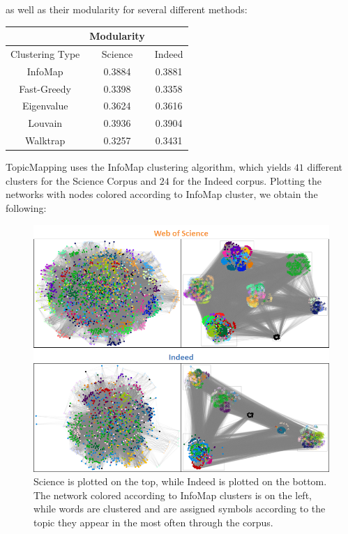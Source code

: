 \documentclass[12pt]{article}
\begin{document}
\noindent as well as their modularity for several different methods:
\vspace{2mm}
\begin{center}
	\begin{tabular}{ |c|c|c|  }
		\hline
		&Modularity& \\
		\hline
		Clustering Type&Science&Indeed \\ 
		\hline 
		InfoMap& 0.3884&0.3881 \\
		Fast-Greedy& 0.3398& 0.3358\\
		Eigenvalue& 0.3624&0.3616 \\
		Louvain&0.3936&0.3904 \\
		Walktrap&0.3257&0.3431 \\
		\hline
	\end{tabular}
\end{center}
\vspace{2mm}
\noindent TopicMapping uses the InfoMap clustering algorithm, which yields $41$ different clusters for the Science Corpus and $24$ for the Indeed corpus. Plotting the networks with nodes colored according to InfoMap cluster, we obtain the following:
\vspace{2mm}
\begin{figure}[H]
	\centering
	\includegraphics[scale=0.5]{Images/networks.png}
	\caption{Science is plotted on the top, while Indeed is plotted on the bottom. The network colored according to InfoMap clusters is on the left, while words are clustered and are assigned symbols according to the topic they appear in the most often through the corpus.}
\end{figure}
\vspace{2mm}
\end{document}
